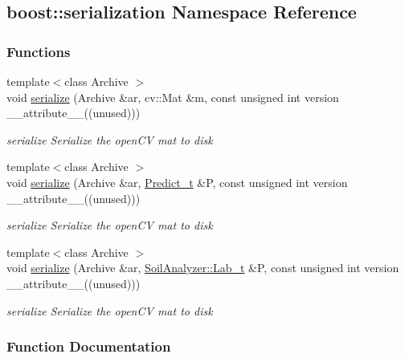 \hypertarget{namespaceboost_1_1serialization}{}\subsection{boost\+:\+:serialization Namespace Reference}
\label{namespaceboost_1_1serialization}
\subsubsection*{Functions}
\begin{DoxyCompactItemize}
\item 
{\footnotesize template$<$class Archive $>$ }\\void \hyperlink{namespaceboost_1_1serialization_acf3ecd0fdaa3726a2332e266a4ecfe47}{serialize} (Archive \&ar, cv\+::\+Mat \&m, const unsigned int version \+\_\+\+\_\+attribute\+\_\+\+\_\+((unused)))
\begin{DoxyCompactList}\small\item\em serialize Serialize the open\+C\+V mat to disk \end{DoxyCompactList}\item 
{\footnotesize template$<$class Archive $>$ }\\void \hyperlink{namespaceboost_1_1serialization_ad463c4b6874e90eced139f8b1a7abdc3}{serialize} (Archive \&ar, \hyperlink{_soil_math_types_8h_aaeba766195a440b2539f0438d3d41f95}{Predict\+\_\+t} \&P, const unsigned int version \+\_\+\+\_\+attribute\+\_\+\+\_\+((unused)))
\begin{DoxyCompactList}\small\item\em serialize Serialize the open\+C\+V mat to disk \end{DoxyCompactList}\item 
{\footnotesize template$<$class Archive $>$ }\\void \hyperlink{namespaceboost_1_1serialization_aa5c14ec0d506df58739d30387cc0e6ec}{serialize} (Archive \&ar, \hyperlink{struct_soil_analyzer_1_1_lab__t}{Soil\+Analyzer\+::\+Lab\+\_\+t} \&P, const unsigned int version \+\_\+\+\_\+attribute\+\_\+\+\_\+((unused)))
\begin{DoxyCompactList}\small\item\em serialize Serialize the open\+C\+V mat to disk \end{DoxyCompactList}\end{DoxyCompactItemize}


\subsubsection{Function Documentation}
\hypertarget{namespaceboost_1_1serialization_aa5c14ec0d506df58739d30387cc0e6ec}{}
